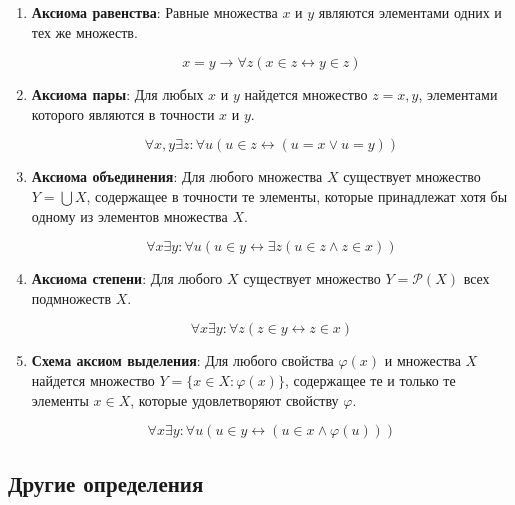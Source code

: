 \begin{enumerate}

	\item \textbf{Аксиома равенства}: Равные множества $x$ и $y$ являются элементами одних и тех же множеств.

		$$ x = y \rightarrow \forall z ( x \in z \leftrightarrow y \in z ) $$ 

	\item \textbf{Аксиома пары}: Для любых $x$ и $y$ найдется множество $ z = {x, y}$, элементами которого являются в
		точности $x$ и $y$.

		$$ \forall x, y \exists z : \forall u (u \in z \leftrightarrow ( u = x \lor u = y)) $$ 

	\item \textbf{Аксиома объединения}: Для любого множества $X$ существует множество $Y = \bigcup X$, содержащее в
		точности те элементы, которые принадлежат хотя бы одному из элементов множества $X$.

		$$ \forall x \exists y: \forall u ( u \in y \leftrightarrow \exists z (u \in z \land z \in x)) $$ 

	\item \textbf{Аксиома степени}: Для любого $X$ существует множество $ Y = \mathcal{P} (X)$ всех подмножеств $X$.

		$$ \forall x \exists y : \forall z ( z \in y \leftrightarrow z \in x) $$ 

	\item \textbf{Схема аксиом выделения}: Для любого свойства $\varphi (x)$ и множества $X$ найдется множество $Y = \{x
		\in X: \varphi (x)\}$, содержащее те и только те элементы $x \in X$, которые удовлетворяют свойству $\varphi$.

		$$ \forall x \exists y: \forall u ( u \in y \leftrightarrow (u \in x \land \varphi (u))) $$ 

\end{enumerate}

\subsection{Другие определения}

